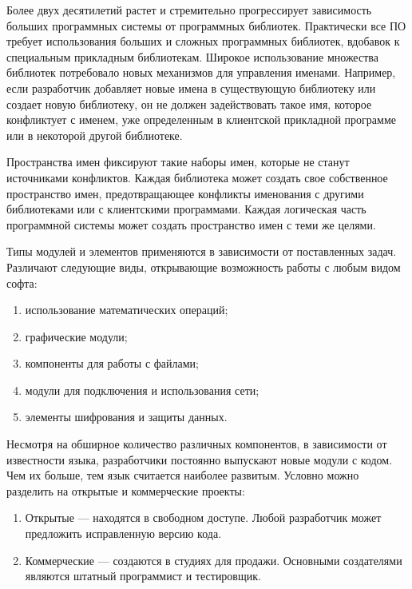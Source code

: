 Более двух десятилетий растет и стремительно прогрессирует зависимость больших программных системы от программных библиотек. Практически все ПО требует использования больших и сложных программных библиотек, вдобавок к специальным прикладным библиотекам. Широкое использование множества библиотек потребовало новых механизмов для управления именами. Например, если разработчик добавляет новые имена в существующую библиотеку или создает новую библиотеку, он не должен задействовать такое имя, которое конфликтует с именем, уже определенным в клиентской прикладной программе или в некоторой другой библиотеке. 

Пространства имен фиксируют такие наборы имен, которые не станут источниками конфликтов. Каждая библиотека может создать свое собственное пространство имен, предотвращающее конфликты именования с другими библиотеками или с клиентскими программами. Каждая логическая часть программной системы может создать пространство имен с теми же целями.

\begin{opr}
  Типы модулей и элементов применяются в зависимости от поставленных задач. Различают следующие виды, открывающие возможность работы с любым видом софта:
  \begin{enumerate}
    \item использование математических операций;
    \item графические модули;
    \item компоненты для работы с файлами;
    \item модули для подключения и использования сети;
    \item элементы шифрования и защиты данных.
  \end{enumerate}
\end{opr}

Несмотря на обширное количество различных компонентов, в зависимости от известности языка, разработчики постоянно выпускают новые модули с кодом. Чем их больше, тем язык считается наиболее развитым. Условно можно разделить на открытые и коммерческие проекты:

\begin{enumerate}
  \item Открытые — находятся в свободном доступе. Любой разработчик может предложить исправленную версию кода.
  \item Коммерческие — создаются в студиях для продажи. Основными создателями являются штатный программист и тестировщик.
\end{enumerate}

